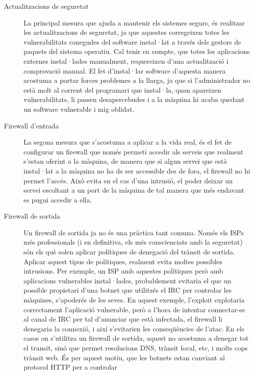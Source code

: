\begin{description}
    \item[Actualitzacions de seguretat] La principal mesura que ajuda a mantenir els sistemes segurs, és
        realitzar les actualitzacions de seguretat, ja que aquestes corregeixen totes les vulnerabilitats
        conegudes del software instal·lat a través dels gestors de paquets del sistema operatiu. Cal tenir 
        en compte, que totes les aplicacions externes instal·lades manualment, requereixen d'una actualització i 
        comprovació manual. El fet d'instal·lar software d'aquesta manera acostuma a portar forces problemes 
        a la llarga, ja que si l'administrador no està molt al corrent del programari que instal·la,
        quan apareixen vulnerabilitats, li passen desapercebudes i a la màquina hi acaba quedant un software 
        vulnerable i mig oblidat.
    \item[Firewall d'entrada] La segona mesura que s'acostuma a aplicar a la vida real, és el fet de configurar
        un firewall que només permeti accedir als serveis que realment s'estan oferint a la màquina, de manera
        que si algun servei que està instal·lat a la màquina no ha de ser accessible des de fora, el firewall
        no hi permet l'accés. Això evita en el cas d'una intrusió, el poder deixar un servei escoltant a un port
        de la màquina de tal manera que més endavant es pugui accedir a ella.
    \item[Firewall de sortida] Un firewall de sortida ja no és una pràctica tant comuna. Només els ISPs més 
        professionals (i en definitiva, els més conscienciats amb la seguretat) són els què solen aplicar 
        polítiques de denegació del trànsit de sortida. Aplicar aquest tipus de polítiques, realment
        evita moltes possibles intrusions. Per exemple, un ISP amb aquestes polítiques però amb aplicacions 
        vulnerables instal·lades, probablement evitaria el que un possible propietari d'una botnet que utilitzés
        el IRC per controlar les màquines, s'apoderés de les seves. En aquest exemple, l'exploit explotaria 
        correctament l'aplicació vulnerable, però a l'hora de intentar connectar-se al canal de IRC per tal
        d'anunciar que està infectada, el firewall li denegaria la connexió, i així s'evitarien les 
		conseqüències de l'atac. 
        En els casos on s'utilitza un firewall de sortida, aquest no acostuma
        a denegar tot el transit, sinó que permet resolucions DNS, trànsit local, etc, i molts cops trànsit web. 
        És per aquest motiu, que les botnets estan canviant al protocol HTTP per a controlar 

\end{description}
